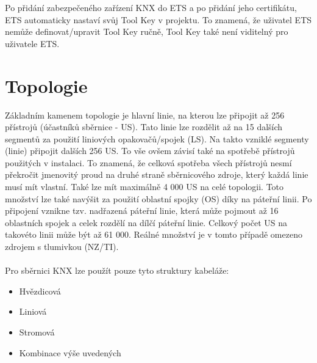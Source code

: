 Po přidání zabezpečeného zařízení KNX  do ETS a po přidání jeho certifikátu, ETS automaticky nastaví svůj Tool Key v projektu. To znamená, že uživatel ETS nemůže definovat/upravit Tool Key ručně, Tool Key také není viditelný pro uživatele ETS. \cite{KNX Secure}

\section{Topologie}
Základním kamenem topologie je hlavní linie, na kterou lze připojit až 256 přístrojů (účastníků sběrnice - US). Tato linie lze rozdělit až na 15 dalších segmentů za použití liniových opakovačů/spojek (LS). Na takto vzniklé segmenty (linie) připojit dalších 256 US. To vše ovšem závisí také na spotřebě přístrojů použitých v instalaci. To znamená, že celková spotřeba všech přístrojů nesmí překročit jmenovitý proud na druhé straně sběrnicového zdroje, který každá linie musí mít vlastní. Také lze mít maximálně 4 000 US na celé topologii. Toto množství lze také navýšit za použití oblastní spojky (OS) díky na páteřní linii. Po připojení vznikne tzv. nadřazená páteřní linie, která může pojmout až 16 oblastních spojek a celek rozdělí na dílčí páteřní linie. Celkový počet US na takovéto linii může být až 61 000. Reálné množství je v tomto případě omezeno zdrojem s tlumivkou (NZ/TI). \cite{Topologie}\\\\
Pro sběrnici KNX lze použít pouze tyto struktury kabeláže:
\begin{itemize}
    \item Hvězdicová
     \item Liniová
     \item Stromová
     \item Kombinace výše uvedených
\end{itemize}
